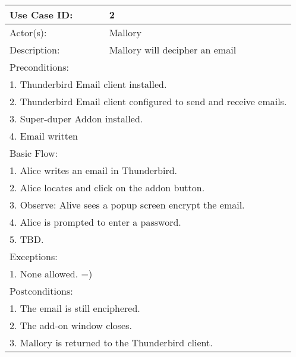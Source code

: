 %
\begin{longtable} {|p{3cm}|p{9cm}|} %
	\hline
Use Case ID: & 2\\
	\hline
Actor(s): & Mallory \\
	\hline
Description: & Mallory will decipher an email \\
	\hline
	\multicolumn{2}{|l|}{Preconditions:} \\
	\multicolumn{2}{|l|}{1. Thunderbird Email client installed.} \\
	\multicolumn{2}{|l|}{2. Thunderbird Email client configured to send and receive emails.}\\
	\multicolumn{2}{|l|}{3. Super-duper Addon installed.} \\
	\multicolumn{2}{|l|}{4. Email written} \\
	\hline
	\multicolumn{2}{|l|}{Basic Flow:} \\
	\multicolumn{2}{|l|}{1. Alice writes an email in Thunderbird.}\\
	\multicolumn{2}{|l|}{2. Alice locates and click on the addon button.} \\
	\multicolumn{2}{|l|}{3. Observe: Alive sees a popup screen encrypt the email.} \\
	\multicolumn{2}{|l|}{4. Alice is prompted to enter a password.}\\
	\multicolumn{2}{|l|}{5. TBD.}\\
	\hline
	\hline
	\multicolumn{2}{|l|}{Exceptions:} \\
	\multicolumn{2}{|l|}{1. None allowed. =)} \\
	\hline
	\hline
	\multicolumn{2}{|l|}{Postconditions:} \\
	\multicolumn{2}{|l|}{1. The email is still enciphered.} \\
	\multicolumn{2}{|l|}{2. The add-on window closes.} \\
	\multicolumn{2}{|l|}{3. Mallory is returned to the Thunderbird client.} \\
	\hline
\end{longtable}